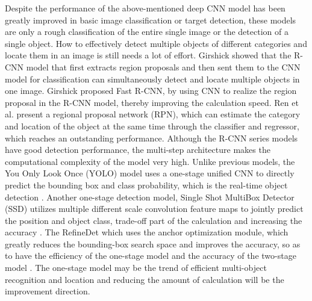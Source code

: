 \documentclass[10pt, a4paper]{article}
\begin{document}
\begin{multicols}{2}
Despite the performance of the above-mentioned deep CNN model has been greatly improved in basic image classification or target detection, these models are only a rough classification of the entire single image or the detection of a single object. How to effectively detect multiple objects of different categories and locate them in an image is still needs a lot of effort. Girshick \cite{girshick2014rich} showed that the R-CNN model that first extracts region proposals and then sent them to the CNN model for classification can simultaneously detect and locate multiple objects in one image. Girshick \cite{girshick2015fast} proposed Fast R-CNN, by using CNN to realize the region proposal in the R-CNN model, thereby improving the calculation speed. Ren et al. \cite{ren2015faster} present a regional proposal network (RPN), which can estimate the category and location of the object at the same time through the classifier and regressor, which reaches an outstanding performance. Although the R-CNN series models have good detection performance, the multi-step architecture makes the computational complexity of the model very high. Unlike previous models, the You Only Look Once (YOLO) model uses a one-stage unified CNN to directly predict the bounding box and class probability, which is the real-time object detection \cite{redmon2016you}. Another one-stage detection model, Single Shot MultiBox Detector (SSD) utilizes multiple different scale convolution feature maps to jointly predict the position and object class, trade-off part of the calculation and increasing the accuracy \cite{liu2016ssd}. The RefineDet which uses the anchor optimization module, which greatly reduces the bounding-box search space and improves the accuracy, so as to have the efficiency of the one-stage model and the accuracy of the two-stage model \cite{zhang2018single}. The one-stage model may be the trend of efficient multi-object recognition and location and reducing the amount of calculation will be the improvement direction.
	\par

\end{multicols}
\end{document}
